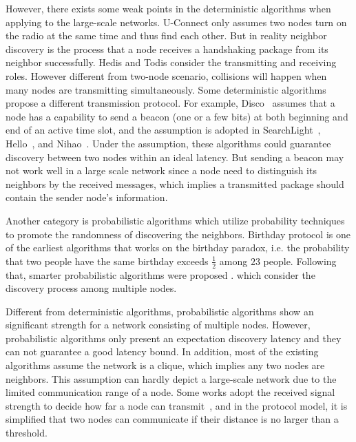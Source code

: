 However, there exists some weak points in the deterministic algorithms when applying to the large-scale networks.
U-Connect \cite{kandhalu2010u} only assumes two nodes turn on the radio at the same time and thus find each other. 
But in reality neighbor discovery is the process that a node receives a handshaking package from its neighbor successfully. 
Hedis and Todis \cite{chen2015heterogeneous} consider the transmitting and receiving roles.
However different from two-node scenario, collisions will happen when many nodes are transmitting simultaneously. 
Some deterministic algorithms propose a different transmission protocol.
For example, Disco~\cite{dutta2008practical} assumes that a node has a capability to send a beacon (one or a few bits) at both beginning and end of an active time slot, and the assumption is adopted in 
SearchLight~\cite{bakht2012searchlight}, Hello~\cite{sun2014hello}, and Nihao~\cite{qiu2016talk}.
Under the assumption, these algorithms could guarantee discovery between two nodes within an ideal latency. But sending a beacon may not work well in a large scale network since a node need to distinguish its neighbors by the received messages, which implies a transmitted package should contain the sender node's information\cite{zhou2004impact}.


Another category is probabilistic algorithms \cite{mcglynn2001birthday,
vasudevan2009neighbor,you2011aloha,song2014probabilistic} which utilize probability techniques to promote the randomness
of discovering the neighbors. 
Birthday protocol \cite{mcglynn2001birthday} is one of the earliest algorithms that works on the birthday
paradox, i.e. the probability that two people have the same
birthday exceeds $\frac{1}{2}$ among $23$ people. Following that,
smarter probabilistic algorithms were proposed \cite{vasudevan2009neighbor, you2011aloha, song2014probabilistic}. which consider the discovery process among multiple nodes.

Different from deterministic algorithms,
probabilistic algorithms show an significant strength for a network consisting of multiple nodes.
However, probabilistic algorithms only present an expectation discovery latency and they
can not guarantee a good latency bound.
In addition, most of the existing algorithms assume the network is a clique, which implies any two nodes are neighbors. 
This assumption can hardly depict a large-scale network due to the limited communication range of a node.
Some works adopt the received signal strength to decide how far a node can transmit~\cite{daiya2011experimental}, and in the protocol model, it is simplified that two nodes can communicate if their distance is no larger than a threshold.







